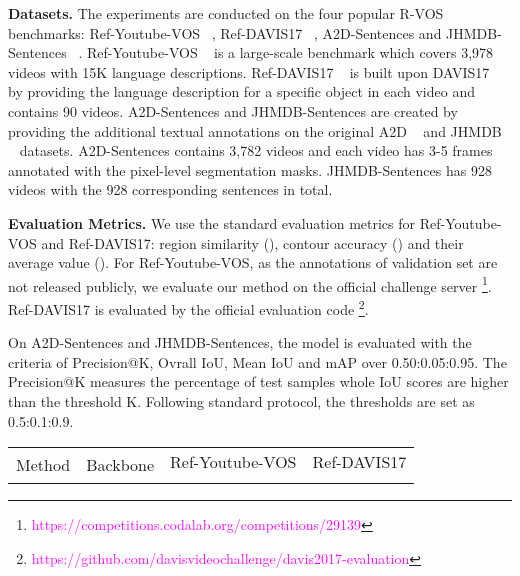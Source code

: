 \documentclass[10pt,twocolumn,letterpaper]{article}
\newcommand{\myparagraph}[1]{{\vspace{.5em} \noindent \bf #1}}
\begin{document}
{\myparagraph{Datasets.} The experiments are conducted on the four popular R-VOS benchmarks: Ref-Youtube-VOS ~\cite{seo2020urvos}, Ref-DAVIS17 ~\cite{khoreva2018rvos}, A2D-Sentences and JHMDB-Sentences ~\cite{gavrilyuk2018a2dsentences}. 
Ref-Youtube-VOS ~\cite{seo2020urvos} is a large-scale benchmark which covers 3,978 videos with 15K language descriptions. Ref-DAVIS17 ~\cite{khoreva2018rvos} is built upon DAVIS17 ~\cite{pont2017davis} by providing the language description for a specific object in each video and contains 90 videos. A2D-Sentences and JHMDB-Sentences are created by providing the additional textual annotations on the original A2D ~\cite{xu2015a2d} and JHMDB ~\cite{jhuang2013jhmdb} datasets. A2D-Sentences contains 3,782 videos and each video has 3-5 frames annotated with the pixel-level segmentation masks. JHMDB-Sentences has 928 videos with the 928 corresponding sentences in total. 


\myparagraph{Evaluation Metrics.} We use the standard evaluation metrics for Ref-Youtube-VOS and Ref-DAVIS17: region similarity (), contour accuracy () and their average value (). For Ref-Youtube-VOS, as the annotations of validation set are not released publicly, we evaluate our method on the official challenge server
\footnote{\textcolor{magenta}{https://competitions.codalab.org/competitions/29139}}. Ref-DAVIS17 is evaluated by the official evaluation code \footnote{\textcolor{magenta}{https://github.com/davisvideochallenge/davis2017-evaluation}}.

On A2D-Sentences and JHMDB-Sentences, the model is evaluated with the criteria of Precision@K, Ovrall IoU, Mean IoU and mAP over 0.50:0.05:0.95. The Precision@K measures the percentage of test samples whole IoU scores are higher than the threshold K. Following standard protocol, the thresholds are set as 0.5:0.1:0.9.


\begin{table*}[t]
    \begin{center}
        \begin{tabular}{l | c | c c c | c c c}

\toprule

\multirow{2}{*}{Method} & \multirow{2}{*}{Backbone} & \multicolumn{3}{c}{Ref-Youtube-VOS} & \multicolumn{3}{c}{Ref-DAVIS17} \\

\arrayrulecolor{white}\cline{3-8}
\arrayrulecolor{black}\cline{3-8}
\arrayrulecolor{black}\cline{3-8}
\arrayrulecolor{black}\cline{3-8}
\arrayrulecolor{white}\cline{3-8}


\end{tabular}
\end{center}
\end{table*}}
\end{document}
